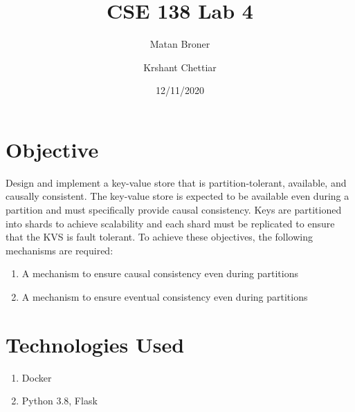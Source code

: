 \documentclass[12pt]{article}
\title{CSE 138 Lab 4}
\author{
  Matan Broner\\
  \and
  Krshant Chettiar\\
}
\date{12/11/2020}
\begin{document}
\maketitle

\section{Objective}
Design and implement a key-value store that is partition-tolerant, available, and causally consistent. The key-value store is expected to be available even during a partition and must specifically provide causal consistency. Keys are partitioned into shards to achieve scalability and each shard must be replicated to ensure that the KVS is fault tolerant.
\newline
To achieve these objectives, the following mechanisms are required:
\begin{enumerate}
	\item A mechanism to ensure causal consistency even during partitions
	\item A mechanism to ensure eventual consistency even during partitions

\end{enumerate}

\section{Technologies Used}
\begin{enumerate}
	\item Docker
	\item Python 3.8, Flask
\end{enumerate}
\end{document}
